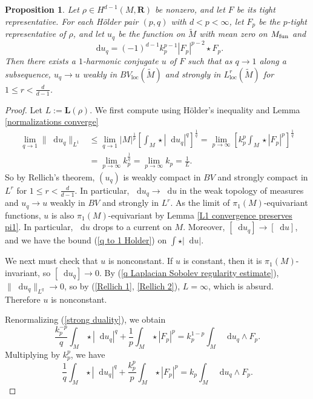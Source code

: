 \documentclass[reqno,11pt]{amsart}
\newcommand{\RR}{\mathbf{R}}
\newcommand*\dif{\mathop{}\!\mathrm{d}}
\newcommand{\Comass}{\mathbf L}
\newcommand{\loc}{\mathrm{loc}}
\newtheorem{proposition}[theorem]{Proposition}
\theoremstyle{definition}
\numberwithin{equation}{section}
\begin{document}
\begin{proposition}\label{existence 1}
Let $\rho \in H^{d - 1}(M, \RR)$ be nonzero, and let $F$ be its tight representative.
For each H\"older pair $(p, q)$ with $d < p < \infty$, let $F_p$ be the $p$-tight representative of $\rho$, and let $u_q$ be the function on $\tilde M$ with mean zero on $M_{\rm fun}$ and
$$\dif u_q = (-1)^{d - 1} k_p^{p - 1} |F_p|^{p - 2} \star F_p.$$
Then there exists a $1$-harmonic conjugate $u$ of $F$ such that as $q \to 1$ along a subsequence, $u_q \to u$ weakly in $BV_\loc(\tilde M)$ and strongly in $L^r_\loc(\tilde M)$ for $1 \leq r < \frac{d}{d - 1}$.
\end{proposition}
\begin{proof}
Let $L := \Comass(\rho)$.
We first compute using H\"older's inequality and Lemma \ref{normalizations converge}
\begin{align}
\lim_{q \to 1} \|\dif u_q\|_{L^1}
&\leq \lim_{q \to 1} |M|^{\frac{1}{p}} \left[\int_M \star |\dif u_q|^q\right]^{\frac{1}{q}} = \lim_{p \to \infty} \left[k_p^p \int_M \star |F_p|^p\right]^{\frac{1}{q}} \label{Rellich 1}\\
&= \lim_{p \to \infty} k_p^{\frac{1}{q}} = \lim_{p \to \infty} k_p = \frac{1}{L} \label{Rellich 2}.
\end{align}
So by Rellich's theorem, $(u_q)$ is weakly compact in $BV$ and strongly compact in $L^r$ for $1 \leq r < \frac{d}{d - 1}$.
In particular, $\dif u_q \to \dif u$ in the weak topology of measures and $u_q \to u$ weakly in $BV$ and strongly in $L^r$.
As the limit of $\pi_1(M)$-equivariant functions, $u$ is also $\pi_1(M)$-equivariant by Lemma \ref{L1 convergence preserves pi1}.
In particular, $\dif u$ drops to a current on $M$.
Moreover, $[\dif u_q] \to [\dif u]$, and we have the bound (\ref{q to 1 Holder}) on $\int \star |\dif u|$.

We next must check that $u$ is nonconstant.
If $u$ is constant, then it is $\pi_1(M)$-invariant, so $[\dif u_q] \to 0$.
By (\ref{q Laplacian Sobolev regularity estimate}), $\|\dif u_q\|_{L^q} \to 0$, so by (\ref{Rellich 1}, \ref{Rellich 2}), $L = \infty$, which is absurd.
Therefore $u$ is nonconstant.

Renormalizing (\ref{strong duality}), we obtain 
$$\frac{k_p^{-p}}{q} \int_M \star |\dif u_q|^q + \frac{1}{p} \int_M \star |F_p|^p = k_p^{1 - p} \int_M \dif u_q \wedge F_p.$$
Multiplying by $k_p^p$, we have 
\begin{equation}\label{1 strong duality before limits}
	\frac{1}{q} \int_M \star |\dif u_q|^q + \frac{k_p^p}{p} \int_M \star |F_p|^p = k_p \int_M \dif u_q \wedge F_p.
\end{equation}


\end{proof}
\end{document}
